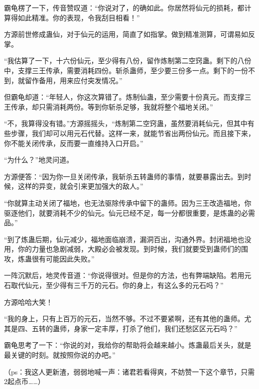 \begin{this_body}
霸龟楞了一下，传音赞叹道：“你说对了，的确如此。你居然将仙元的损耗，都计算得如此精准。你的表现，令我刮目相看！”

方源前世修成蛊仙，对于仙元的运用，简直了如指掌。做到精准测算，可谓易如反掌。

“我估算了一下，十六份仙元，至少得有八份，留作炼制第二空窍蛊。剩下的八份中，支撑三王传承，需要消耗四份。斩杀蛊师，至少要三份多一点。剩下的一份不到，就留作备用，用来应付突发情况。”

但霸龟却道：“年轻人，你这次算错了。炼制仙蛊，至少需要十份真元。而支撑三王传承，却只需消耗两份。等到你斩杀足够，我就将整个福地关闭。”

“不，我算得没有错。”方源摇摇头，“炼制第二空窍蛊，虽然要消耗仙元，但其中有些步骤，我们却可以用元石代替。这样一来，就能节省出两份仙元。而且接下来，你不能关闭传承，反而要一直维持入口开启。”

“为什么？”地灵问道。

方源便答：“因为你一旦关闭传承，我斩杀五转蛊师的事情，就要暴露出去。到时候，这样的异变，就会引来更加强大的敌人。”

“你就算主动关闭了福地，也无法驱除传承中留下的蛊师。因为三王改造福地，你驱逐他们，就要消耗不少的仙元。仙元已经不足，每一分都很重要，是炼蛊的必需品。”

“到了炼蛊后期，仙元减少，福地面临崩溃，漏洞百出，沟通外界。封闭福地也没用，你的力量也急剧减弱，大殿必会被发现。到时候，我们就要受到蛊师们的围攻，炼蛊很有可能因此失败。”

一阵沉默后，地灵传音道：“你说得很对。但是你的方法，也有弊端缺陷。若用元石取代仙元，至少得有三千万的元石。你的身上，有这么多的元石吗？”

方源哈哈大笑！

“我的身上，只有上百万的元石，当然不够。不过不要紧啊，还有其他的蛊师。尤其是四、五转的蛊师，身家一定丰厚，打杀了他们，我们还愁区区元石吗？”

霸龟思考了一下：“你说的对，我给你的帮助将会越来越小。炼蛊最后关头，就是最关键的时刻。就按照你说的办吧。”

（ps：我这人更新渣，弱弱地喊一声：诸君若看得爽，不妨赞一下这个章节，只需2起点币……）

\end{this_body}

